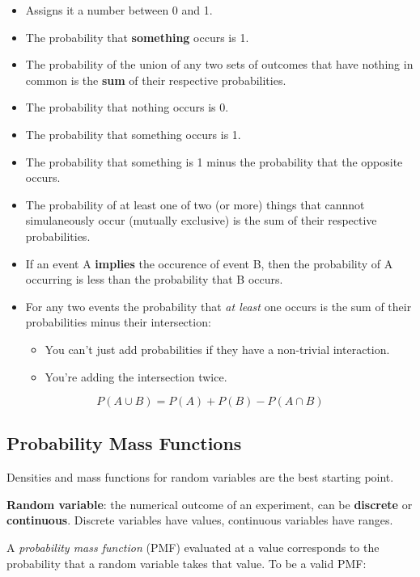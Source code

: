 \documentclass[]{article}
\providecommand{\tightlist}{%
  \setlength{\itemsep}{0pt}\setlength{\parskip}{0pt}}
\begin{document}
\begin{itemize}
\item
  Assigns it a number between 0 and 1.
\item
  The probability that \textbf{something} occurs is 1.
\item
  The probability of the union of any two sets of outcomes that have
  nothing in common is the \textbf{sum} of their respective
  probabilities.
\item
  The probability that nothing occurs is 0.
\item
  The probability that something occurs is 1.
\item
  The probability that something is 1 minus the probability that the
  opposite occurs.
\item
  The probability of at least one of two (or more) things that cannnot
  simulaneously occur (mutually exclusive) is the sum of their
  respective probabilities.
\item
  If an event A \textbf{implies} the occurence of event B, then the
  probability of A occurring is less than the probability that B occurs.
\item
  For any two events the probability that \emph{at least} one occurs is
  the sum of their probabilities minus their intersection:

  \begin{itemize}
  \tightlist
  \item
    You can't just add probabilities if they have a non-trivial
    interaction.
  \item
    You're adding the intersection twice.
  \end{itemize}
\end{itemize}

\[ P(A \cup B) = P(A) + P(B) - P(A \cap B) \]

\hypertarget{probability-mass-functions}{%
\subsection{Probability Mass
Functions}\label{probability-mass-functions}}

Densities and mass functions for random variables are the best starting
point.

\textbf{Random variable}: the numerical outcome of an experiment, can be
\textbf{discrete} or \textbf{continuous}. Discrete variables have
values, continuous variables have ranges.

A \emph{probability mass function} (PMF) evaluated at a value
corresponds to the probability that a random variable takes that value.
To be a valid PMF:
\end{document}
